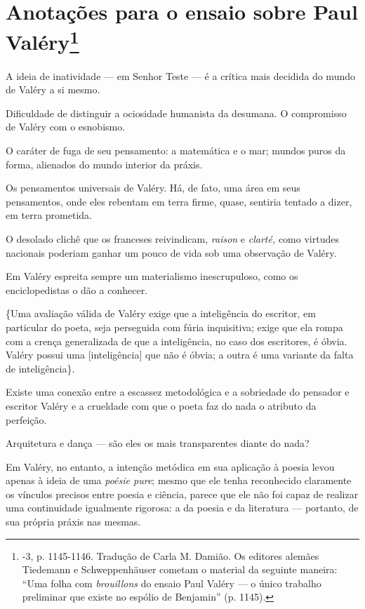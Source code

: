 \chapter{Anotações para o ensaio sobre Paul Valéry\footnote[*]{-3, p. 1145-1146. Tradução de Carla M. Damião. Os
  editores alemães Tiedemann e Schweppenhäuser cometam o material da
  seguinte maneira: ``Uma folha com \emph{brouillons} do ensaio Paul
  Valéry --- o único trabalho preliminar que existe no espólio de
  Benjamin'' (p. 1145).}}

A ideia de inatividade --- em Senhor Teste --- é a crítica mais decidida do
mundo de Valéry a si mesmo.

Dificuldade de distinguir a ociosidade humanista da desumana. O
compromisso de Valéry com o esnobismo.

O caráter de fuga de seu pensamento: a matemática e o mar; mundos puros
da forma, alienados do mundo interior da práxis.

Os pensamentos universais de Valéry. Há, de fato, uma área em seus
pensamentos, onde eles rebentam em terra firme, quase, sentiria tentado
a dizer, em terra prometida.

O desolado clichê que os franceses reivindicam, \emph{raison} e
\emph{clarté,} como virtudes nacionais poderiam ganhar um pouco de vida
sob uma observação de Valéry.

Em Valéry espreita sempre um materialismo inescrupuloso, como os
enciclopedistas o dão a conhecer.

\{Uma avaliação válida de Valéry exige que a inteligência do escritor,
em particular do poeta, seja perseguida com fúria inquisitiva; exige que
ela rompa com a crença generalizada de que a inteligência, no caso dos
escritores, é óbvia. Valéry possui uma {[}inteligência{]} que não é
óbvia; a outra é uma variante da falta de inteligência\}.

Existe uma conexão entre a escassez metodológica e a sobriedade do
pensador e escritor Valéry e a crueldade com que o poeta faz do nada o
atributo da perfeição.

Arquitetura e dança --- são eles os mais transparentes diante do nada?

Em Valéry, no entanto, a intenção metódica em sua aplicação à poesia
levou apenas à ideia de uma \emph{poésie pure}; mesmo que ele tenha
reconhecido claramente os vínculos precisos entre poesia e ciência,
parece que ele não foi capaz de realizar uma continuidade igualmente
rigorosa: a da poesia e da literatura --- portanto, de sua própria práxis
nas mesmas.

